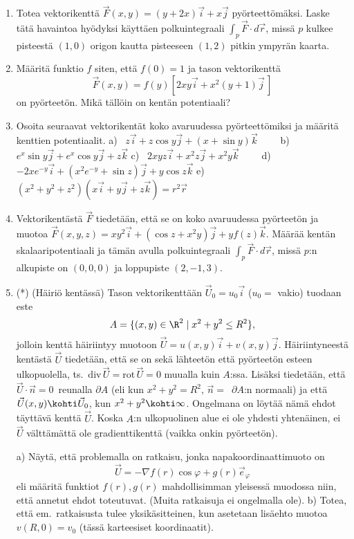 \Harj
\begin{enumerate}

\item
Totea vektorikenttä $\vec F(x,y)=(y+2x)\vec i+x\vec j$ pyörteettömäksi. Laske tätä havaintoa
hyödyksi käyttäen polkuintegraali $\int_p \vec F \cdot d\vec r$, missä $p$ kulkee pisteestä
$(1,0)$ origon kautta pisteeseen $(1,2)$ pitkin ympyrän kaarta.

\item
Määritä funktio $f$ siten, että $f(0)=1$ ja tason vektorikenttä 
\[
\vec F(x,y)=f(y)[2xy\vec i+x^2(y+1)\vec j\,]
\] 
on pyörteetön. Mikä tällöin on kentän potentiaali?

\item
Osoita seuraavat vektorikentät koko avaruudessa pyörteettömiksi ja määritä kenttien 
potentiaalit.
\vspace{1mm}\newline
a) \ $z\vec i+z\cos y\vec j+(x+\sin y)\vec k \qquad$
b) \ $e^x\sin y\vec j+e^x\cos y\vec j+z\vec k$ \newline
c) \ $2xyz\vec i+x^2z\vec j+x^2y\vec k \qquad$
d) \ $-2xe^{-y}\vec i+(x^2e^{-y}+\sin z)\vec j+y\cos z\vec k$ \newline
e) \ $(x^2+y^2+z^2)(x\vec i+y\vec j+z\vec k)=r^2\vec r$

\item 
Vektorikentästä $\vec F$ tiedetään, että se on koko avaruudessa pyörteetön ja muotoa 
$\vec F(x,y,z)=xy^2\vec i+(\cos z+x^2y)\vec j+yf(z)\vec k$. Määrää kentän 
skalaaripotentiaali ja tämän avulla polkuintegraali $\int_p \vec F\cdot d\vec r$, missä
$p$:n alkupiste on $(0,0,0)$ ja loppupiste $(2,-1,3)$. 

\item (*) 
(Häiriö kentässä) Tason vektorikenttään $\vec U_0=u_0\vec i$ ($u_0=$ vakio) tuodaan este
\[
A=\{(x,y)\in\R^2 \mid x^2+y^2 \le R^2\},
\] 
jolloin kenttä häiriintyy muotoon $\vec U=u(x,y)\vec i + v(x,y)\vec j$. Häiriintyneestä
kentästä $\vec U$ tiedetään, että se on sekä lähteetön että pyörteetön esteen ulkopuolella,
ts.\ $\text{div}\,\vec U = \text{rot}\,\vec U=0$ muualla kuin $A$:ssa. Lisäksi tiedetään, että
$\vec U \cdot \vec n = 0\,$ reunalla $\partial A$ (eli kun $x^2+y^2=R^2$, $\vec n=\,$
$\partial A$:n normaali) ja että $\vec U(x,y)\kohti\vec U_0$, kun $x^2+y^2\kohti\infty$.
Ongelmana on löytää nämä ehdot täyttävä kenttä $\vec U$. Koska $A$:n ulkopuolinen alue ei
ole yhdesti yhtenäinen, ei $\vec U$ välttämättä ole gradienttikenttä (vaikka onkin 
pyörteetön).

a) Näytä, että problemalla on ratkaisu, jonka napakoordinaattimuoto on
\[
\vec U=-\nabla f(r)\cos\varphi + g(r)\vec e_\varphi
\] 
eli määritä funktiot $f(r),g(r)$ mahdollisimman yleisessä muodossa niin, että annetut ehdot
toteutuvat. (Muita ratkaisuja ei ongelmalla ole). \newline
b) Totea, että em.\ ratkaisusta tulee yksikäsitteinen, kun asetetaan lisäehto muotoa
$v(R,0)=v_0$ (tässä karteesiset koordinaatit).

\end{enumerate}